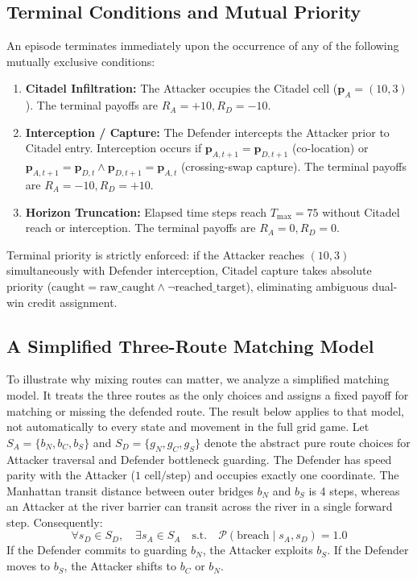 \documentclass[conference]{IEEEtran}
\begin{document}
\subsection{Terminal Conditions and Mutual Priority}
An episode terminates immediately upon the occurrence of any of the following mutually exclusive conditions:
\begin{enumerate}
    \item \textbf{Citadel Infiltration:} The Attacker occupies the Citadel cell ($\bm{p}_A = (10, 3)$). The terminal payoffs are $R_A = +10, R_D = -10$.
    \item \textbf{Interception / Capture:} The Defender intercepts the Attacker prior to Citadel entry. Interception occurs if $\bm{p}_{A, t+1} = \bm{p}_{D, t+1}$ (co-location) or $\bm{p}_{A, t+1} = \bm{p}_{D, t} \land \bm{p}_{D, t+1} = \bm{p}_{A, t}$ (crossing-swap capture). The terminal payoffs are $R_A = -10, R_D = +10$.
    \item \textbf{Horizon Truncation:} Elapsed time steps reach $T_{\max} = 75$ without Citadel reach or interception. The terminal payoffs are $R_A = 0, R_D = 0$.
\end{enumerate}
Terminal priority is strictly enforced: if the Attacker reaches $(10, 3)$ simultaneously with Defender interception, Citadel capture takes absolute priority ($\text{caught} = \text{raw\_caught} \land \neg \text{reached\_target}$), eliminating ambiguous dual-win credit assignment.

\subsection{A Simplified Three-Route Matching Model}
To illustrate why mixing routes can matter, we analyze a simplified matching model. It treats the three routes as the only choices and assigns a fixed payoff for matching or missing the defended route. The result below applies to that model, not automatically to every state and movement in the full grid game. Let $S_A = \{b_N, b_C, b_S\}$ and $S_D = \{g_N, g_C, g_S\}$ denote the abstract pure route choices for Attacker traversal and Defender bottleneck guarding. The Defender has speed parity with the Attacker ($1 \text{ cell/step}$) and occupies exactly one coordinate. The Manhattan transit distance between outer bridges $b_N$ and $b_S$ is 4 steps, whereas an Attacker at the river barrier can transit across the river in a single forward step. Consequently:
\begin{equation}
\forall s_D \in S_D, \quad \exists s_A \in S_A \quad \text{s.t.} \quad \mathcal{P}(\text{breach} \mid s_A, s_D) = 1.0
\end{equation}
If the Defender commits to guarding $b_N$, the Attacker exploits $b_S$. If the Defender moves to $b_S$, the Attacker shifts to $b_C$ or $b_N$.
\end{document}
